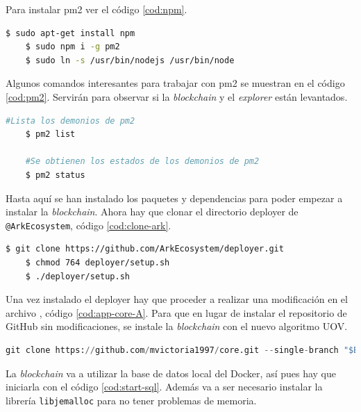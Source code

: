 Para instalar pm2 ver el código \ref{cod:npm}.\\

\begin{lstlisting}[language=Bash,caption=Instalación \textit{blockchain}. Parte VIII, label=cod:npm, style=Consola]
	$ sudo apt-get install npm
	$ sudo npm i -g pm2
	$ sudo ln -s /usr/bin/nodejs /usr/bin/node
\end{lstlisting}

Algunos comandos interesantes para trabajar con pm2 se muestran en el código \ref{cod:pm2}. Servirán para observar si la \textit{blockchain} y el \textit{explorer} están levantados.\\

\begin{lstlisting}[language=Bash,caption=Comandos útiles de pm2, label=cod:pm2, style=Consola]
	#Lista los demonios de pm2
	$ pm2 list

	#Se obtienen los estados de los demonios de pm2
	$ pm2 status
\end{lstlisting}

Hasta aquí se han instalado los paquetes y dependencias para poder empezar a instalar la \textit{blockchain}. Ahora hay que clonar el directorio deployer de \texttt{@ArkEcosystem}, código \ref{cod:clone-ark}.\\

\begin{lstlisting}[language=Bash,caption=Instalación \textit{blockchain}. Parte IX, label=cod:clone-ark, style=Consola]
	$ git clone https://github.com/ArkEcosystem/deployer.git
	$ chmod 764 deployer/setup.sh
	$ ./deployer/setup.sh
\end{lstlisting}


Una vez instalado el deployer hay que proceder a realizar una modificación en el archivo , código \ref{cod:app-core-A}. Para que en lugar de instalar el repositorio de GitHub sin modificaciones, se instale la \textit{blockchain} con el nuevo algoritmo UOV.\\

\begin{lstlisting}[language=Python,caption=Línea 108 app-core.sh, label=cod:app-core-A]
	git clone https://github.com/mvictoria1997/core.git --single-branch "$BRIDGECHAIN_PATH"
\end{lstlisting}

La \textit{blockchain} va a utilizar la base de datos local del Docker, así pues hay que iniciarla con el código \ref{cod:start-sql}. Además va a ser necesario instalar la librería \texttt{libjemalloc} para no tener problemas de memoria.\\

